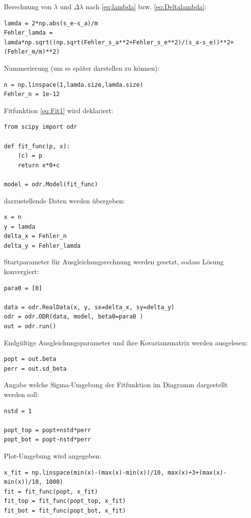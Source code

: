 \documentclass[a4paper,10pt]{article}
\begin{document}
Berechnung von \(\lambda\) und \(\Delta \lambda\) nach \eqref{eq:lambda} bzw. \eqref{eq:Deltalambda}:\begin{lstlisting}
lamda = 2*np.abs(s_e-s_a)/m
Fehler_lamda = lamda*np.sqrt((np.sqrt(Fehler_s_a**2+Fehler_s_e**2)/(s_a-s_e))**2+(Fehler_m/m)**2)

\end{lstlisting} 

Nummerierung (um es später darstellen zu können): \begin{lstlisting}
n = np.linspace(1,lamda.size,lamda.size)
Fehler_n = 1e-12

\end{lstlisting} 

Fitfunktion \eqref{eq:Fit1} wird deklariert:\begin{lstlisting}
from scipy import odr

def fit_func(p, x):
    (c) = p
    return x*0+c

model = odr.Model(fit_func)

\end{lstlisting}

darzustellende Daten werden übergeben:\begin{lstlisting}
x = n
y = lamda
delta_x = Fehler_n
delta_y = Fehler_lamda

\end{lstlisting}

Startparameter für Ausgleichungsrechnung werden gesetzt, sodass Lösung konvergiert:\begin{lstlisting}
para0 = [0]

data = odr.RealData(x, y, sx=delta_x, sy=delta_y)
odr = odr.ODR(data, model, beta0=para0 )
out = odr.run()

\end{lstlisting}

Endgültige Ausgleichungsparameter und ihre Kovarianzmatrix werden ausgelesen:\begin{lstlisting}
popt = out.beta
perr = out.sd_beta

\end{lstlisting}

Angabe welche Sigma-Umgebung der Fitfunktion im Diagramm dargestellt werden soll:\begin{lstlisting}
nstd = 1 

popt_top = popt+nstd*perr
popt_bot = popt-nstd*perr

\end{lstlisting}

Plot-Umgebung wird angegeben:\begin{lstlisting}
x_fit = np.linspace(min(x)-(max(x)-min(x))/10, max(x)+3+(max(x)-min(x))/10, 1000)
fit = fit_func(popt, x_fit)
fit_top = fit_func(popt_top, x_fit)
fit_bot = fit_func(popt_bot, x_fit)

\end{lstlisting}
\end{document}
